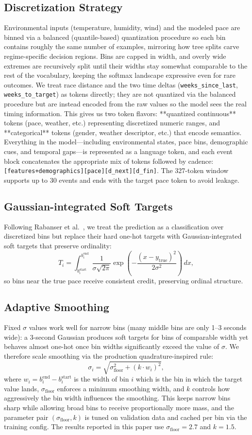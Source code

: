\documentclass{article}
\begin{document}
\subsection{Discretization Strategy}
Environmental inputs (temperature, humidity, wind) and the modeled pace are binned via a balanced (quantile-based) quantization procedure so each bin contains roughly the same number of examples, mirroring how tree splits carve regime-specific decision regions. Bins are capped in width, and overly wide extremes are recursively split until their widths stay somewhat comparable to the rest of the vocabulary, keeping the softmax landscape expressive even for rare outcomes. We treat race distance and the two time deltas (\texttt{weeks\_since\_last}, \texttt{weeks\_to\_target}) as tokens directly; they are not quantized via the balanced procedure but are instead encoded from the raw values so the model sees the real timing information. This gives us two token flavors: **quantized continuous** tokens (pace, weather, etc.) representing discretized numeric ranges, and **categorical** tokens (gender, weather descriptor, etc.) that encode semantics. Everything in the model—including environmental states, pace bins, demographic cues, and temporal gaps—is represented as a language token, and each event block concatenates the appropriate mix of tokens followed by cadence: \texttt{[features+demographics][pace][d\_next][d\_fin]}. The 327-token window supports up to 30 events and ends with the target pace token to avoid leakage.
\subsection{Gaussian-integrated Soft Targets}
Following Rabanser et al.~\cite{rabanser2020discretization}, we treat the prediction as a classification over discretized bins but replace their hard one-hot targets with Gaussian-integrated soft targets that preserve ordinality:
\[
T_i = \int_{b_i^{\text{start}}}^{b_i^{\text{end}}}
\frac{1}{\sigma\sqrt{2\pi}}\exp\left(-\frac{(x - y_{\text{true}})^2}{2\sigma^2}\right)\,dx,
\]
so bins near the true pace receive consistent credit, preserving ordinal structure.
\subsection{Adaptive Smoothing}
Fixed \(\sigma\) values work well for narrow bins (many middle bins are only 1–3 seconds wide): a 3-second Gaussian produces soft targets for bins of comparable width yet behaves almost one-hot once bin widths significantly exceed the value of \(\sigma\). We therefore scale smoothing via the production quadrature-inspired rule:
\[
\sigma_i = \sqrt{ \sigma_{\text{floor}}^2 + (k \cdot w_i)^2 },
\]
where \(w_i = b_i^{\text{end}} - b_i^{\text{start}}\) is the width of bin \(i\) which is the bin in which the target value lands, \(\sigma_{\text{floor}}\) enforces a minimum smoothing width, and \(k\) controls how aggressively the bin width influences the smoothing. This keeps narrow bins sharp while allowing broad bins to receive proportionally more mass, and the parameter pair \((\sigma_{\text{floor}}, k)\) is tuned on validation data and cached per bin via the training config. The results reported in this paper use \(\sigma_{\text{floor}} = 2.7\) and \(k = 1.5\).
\end{document}
